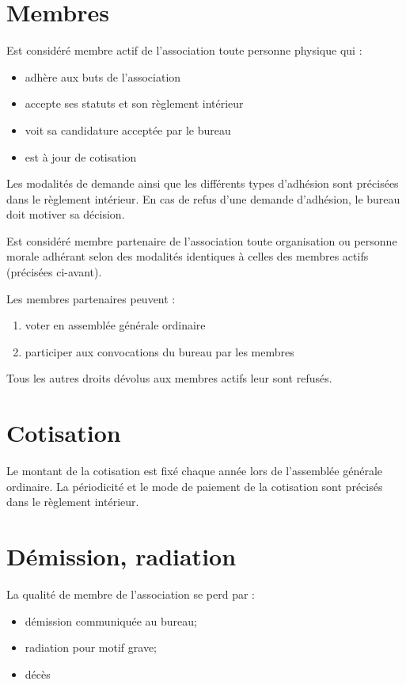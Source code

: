 \documentclass[a4paper, 11pt]{article}
\begin{document}
\section{Membres} %

Est considéré membre actif de l'association toute personne physique qui :

\begin{itemize}
    \item adhère aux buts de l'association
    \item accepte ses statuts et son règlement intérieur
    \item voit sa candidature acceptée par le bureau
    \item est à jour de cotisation
\end{itemize}
Les modalités de demande ainsi que les différents types d'adhésion sont précisées dans le règlement intérieur.
En cas de refus d'une demande d'adhésion, le bureau doit motiver sa décision.

Est considéré membre partenaire de l'association toute organisation ou personne morale adhérant selon des modalités
identiques à celles des membres actifs (précisées ci-avant).

Les membres partenaires peuvent :
\begin{enumerate}
    \item voter en assemblée générale ordinaire
    \item participer aux convocations du bureau par les membres
\end{enumerate}

Tous les autres droits dévolus aux membres actifs leur sont refusés.

\section{Cotisation} %

Le montant de la cotisation est fixé chaque année lors de l'assemblée générale ordinaire.
La périodicité et le mode de paiement de la cotisation sont précisés dans le règlement intérieur.


\section{Démission, radiation} %

La qualité de membre de l'association se perd par :

\begin{itemize}
    \item démission communiquée au bureau;
    \item radiation pour motif grave;
    \item décès
\end{itemize}
\end{document}
